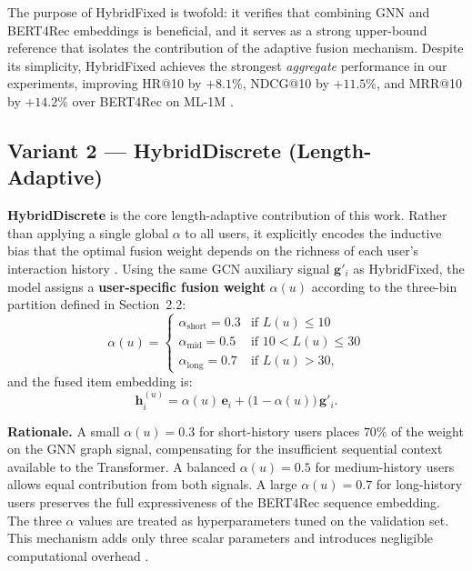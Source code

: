 \documentclass[12pt,a4paper]{report}
\newcommand{\parencite}[1]{\citep{#1}}
\begin{document}
The purpose of HybridFixed is twofold: it verifies that combining
GNN and BERT4Rec embeddings is beneficial, and it serves as a
strong upper-bound reference that isolates the contribution of
the adaptive fusion mechanism. Despite its simplicity, HybridFixed
achieves the strongest \textit{aggregate} performance in our
experiments, improving HR@10 by $+8.1\%$, NDCG@10 by $+11.5\%$,
and MRR@10 by $+14.2\%$ over BERT4Rec on ML-1M
\parencite{ouledmeriem2025hybrid}.

\subsection{Variant 2 — HybridDiscrete (Length-Adaptive)}

\textbf{HybridDiscrete} is the core length-adaptive contribution
of this work. Rather than applying a single global $\alpha$ to
all users, it explicitly encodes the inductive bias that the
optimal fusion weight depends on the richness of each user's
interaction history \parencite{ouledmeriem2025hybrid}. Using the
same GCN auxiliary signal $\mathbf{g}'_i$ as HybridFixed, the
model assigns a \textbf{user-specific fusion weight} $\alpha(u)$
according to the three-bin partition defined in Section~2.2:
\begin{equation}
  \alpha(u) =
  \begin{cases}
    \alpha_{\text{short}} = 0.3 & \text{if } L(u) \leq 10 \\
    \alpha_{\text{mid}}   = 0.5 & \text{if } 10 < L(u) \leq 30 \\
    \alpha_{\text{long}}  = 0.7 & \text{if } L(u) > 30,
  \end{cases}
\end{equation}
and the fused item embedding is:
\begin{equation}
  \mathbf{h}_i^{(u)} = \alpha(u)\, \mathbf{e}_i
    + \bigl(1 - \alpha(u)\bigr)\, \mathbf{g}'_i.
\end{equation}

\textbf{Rationale.} A small $\alpha(u) = 0.3$ for short-history
users places $70\%$ of the weight on the GNN graph signal,
compensating for the insufficient sequential context available
to the Transformer. A balanced $\alpha(u) = 0.5$ for medium-history
users allows equal contribution from both signals. A large
$\alpha(u) = 0.7$ for long-history users preserves the full
expressiveness of the BERT4Rec sequence embedding. The three
$\alpha$ values are treated as hyperparameters tuned on the
validation set. This mechanism adds only three scalar parameters
and introduces negligible computational overhead
\parencite{ouledmeriem2025hybrid}.
\end{document}
